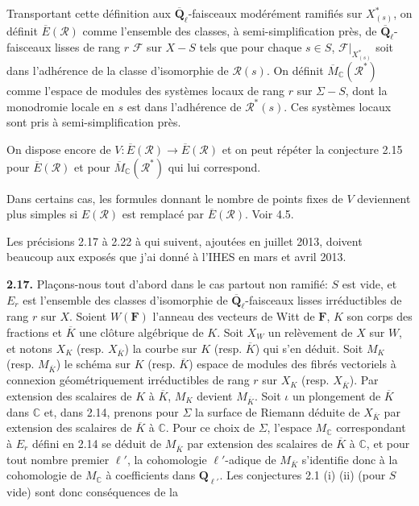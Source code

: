 \documentclass[11pt]{article}
\newcommand{\F}{\mathbf{F}}
\newcommand{\Qbl}{\overline{\mathbf{Q}}_{\ell}}
\newcommand{\C}{\mathbb{C}}
\newcommand{\Rcal}{\mathcal{R}}
\newcommand{\Fcal}{\mathcal{F}}
\newcommand{\Ebar}{\overline{E}}
\newcommand{\Mbar}{\overline{M}}
\newcommand{\para}[1]{\medskip\noindent\textbf{#1}\enspace}
\begin{document}
Transportant cette définition aux \(\Qbl\)-faisceaux modérément ramifiés sur \(X^*_{(s)}\), on définit \(\Ebar(\Rcal)\) comme l'ensemble des classes, à semi-simplification près, de \(\Qbl\)-faisceaux lisses de rang \(r\) \(\Fcal\) sur \(X-S\) tels que pour chaque \(s\in S\), \(\Fcal|_{X^*_{(s)}}\) soit dans l'adhérence de la classe d'isomorphie de \(\Rcal(s)\). On définit \(\Mbar_\C(\Rcal^*)\) comme l'espace de modules des systèmes locaux de rang \(r\) sur \(\Sigma-S\), dont la monodromie locale en \(s\) est dans l'adhérence de \(\Rcal^*(s)\). Ces systèmes locaux sont pris à semi-simplification près.

On dispose encore de \(V:\Ebar(\Rcal)\to\Ebar(\Rcal)\) et on peut répéter la conjecture 2.15 pour \(\Ebar(\Rcal)\) et pour \(\Mbar_\C(\Rcal^*)\) qui lui correspond.

Dans certains cas, les formules donnant le nombre de points fixes de \(V\) deviennent plus simples si \(E(\Rcal)\) est remplacé par \(\Ebar(\Rcal)\). Voir 4.5.




Les précisions 2.17 à 2.22 à qui suivent, ajoutées en juillet 2013, doivent beaucoup aux exposés que j'ai donné à l'IHES en mars et avril 2013.

\para{2.17.} Plaçons-nous tout d'abord dans le cas partout non ramifié: \(S\) est vide, et \(E_r\) est l'ensemble des classes d'isomorphie de \(\Qbl\)-faisceaux lisses irréductibles de rang \(r\) sur \(X\). Soient \(W(\F)\) l'anneau des vecteurs de Witt de \(\F\), \(K\) son corps des fractions et \(\overline K\) une clôture algébrique de \(K\). Soit \(X_W\) un relèvement de \(X\) sur \(W\), et notons \(X_K\) (resp. \(X_{\overline K}\)) la courbe sur \(K\) (resp. \(\overline K\)) qui s'en déduit. Soit \(M_K\) (resp. \(M_{\overline K}\)) le schéma sur \(K\) (resp. \(\overline K\)) espace de modules des fibrés vectoriels à connexion géométriquement irréductibles de rang \(r\) sur \(X_K\) (resp. \(X_{\overline K}\)). Par extension des scalaires de \(K\) à \(\overline K\), \(M_K\) devient \(M_{\overline K}\). Soit \(\iota\) un plongement de \(\overline K\) dans \(\C\) et, dans 2.14, prenons pour \(\Sigma\) la surface de Riemann déduite de \(X_{\overline K}\) par extension des scalaires de \(\overline K\) à \(\C\). Pour ce choix de \(\Sigma\), l'espace \(M_\C\) correspondant à \(E_r\) défini en 2.14 se déduit de \(M_{\overline K}\) par extension des scalaires de \(\overline K\) à \(\C\), et pour tout nombre premier \(\ell'\), la cohomologie \(\ell'\)-adique de \(M_{\overline K}\) s'identifie donc à la cohomologie de \(M_\C\) à coefficients dans \(\mathbf{Q}_{\ell'}\). Les conjectures 2.1 (i) (ii) (pour \(S\) vide) sont donc conséquences de la
\end{document}

